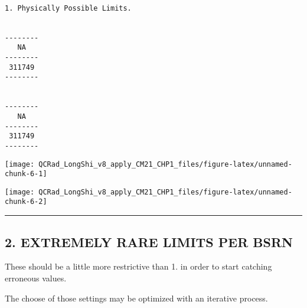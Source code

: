 \documentclass[
  10pt,
  a4paper,oneside]{article}
\newenvironment{Shaded}{\begin{snugshade}}{\end{snugshade}}
\newcommand{\AttributeTok}[1]{\textcolor[rgb]{0.77,0.63,0.00}{#1}}
\newcommand{\ConstantTok}[1]{\textcolor[rgb]{0.00,0.00,0.00}{#1}}
\newcommand{\FunctionTok}[1]{\textcolor[rgb]{0.00,0.00,0.00}{#1}}
\newcommand{\NormalTok}[1]{#1}
\newcommand{\SpecialCharTok}[1]{\textcolor[rgb]{0.00,0.00,0.00}{#1}}
\begin{document}
\begin{Shaded}
\end{Shaded}

\begin{verbatim}

1. Physically Possible Limits.


--------
   NA   
--------
 311749 
--------


--------
   NA   
--------
 311749 
--------
\end{verbatim}

\begin{center}\texttt{[image: QCRad\_LongShi\_v8\_apply\_CM21\_CHP1\_files/figure-latex/unnamed-chunk-6-1]} \end{center}

\begin{center}\texttt{[image: QCRad\_LongShi\_v8\_apply\_CM21\_CHP1\_files/figure-latex/unnamed-chunk-6-2]} \end{center}

\begin{center}\rule{0.5\linewidth}{0.5pt}\end{center}

\newpage

\hypertarget{extremely-rare-limits-per-bsrn}{%
\subsection{2. EXTREMELY RARE LIMITS PER BSRN}\label{extremely-rare-limits-per-bsrn}}

These should be a little more restrictive than 1. in order to start
catching erroneous values.

The choose of those settings may be optimized with an iterative process.
\end{document}
